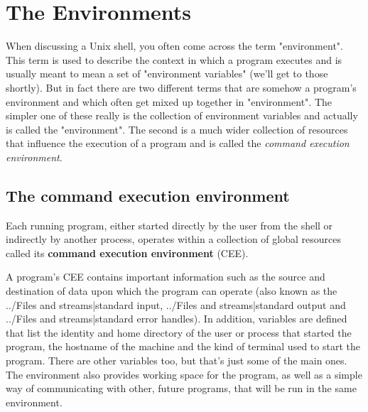 \section{The Environments}
When discussing a Unix shell, you often come across the term "environment".
This term is used to describe the context in which a program executes and is
usually meant to mean a set of "environment variables" (we'll get to those
shortly). But in fact there are two different terms that are somehow a
program's environment and which often get mixed up together in "environment".
The simpler one of these really is the collection of environment variables and
actually is called the "environment". The second is a much wider collection of
resources that influence the execution of a program and is called the
\textit{command execution environment}.

\subsection{The command execution environment}
Each running program, either started directly by the user from the shell or
indirectly by another process, operates within a collection of global resources
called its \textbf{command execution environment} (CEE).

A program's CEE contains important information such as the source and
destination of data upon which the program can operate (also known as the
../Files and streams|standard input, ../Files and streams|standard output and
../Files and streams|standard error handles). In addition, variables are
defined that list the identity and home directory of the user or process that
started the program, the hostname of the machine and the kind of terminal used
to start the program. There are other variables too, but that's just some of
the main ones. The environment also provides working space for the program, as
well as a simple way of communicating with other, future programs, that will be
run in the same environment. 

